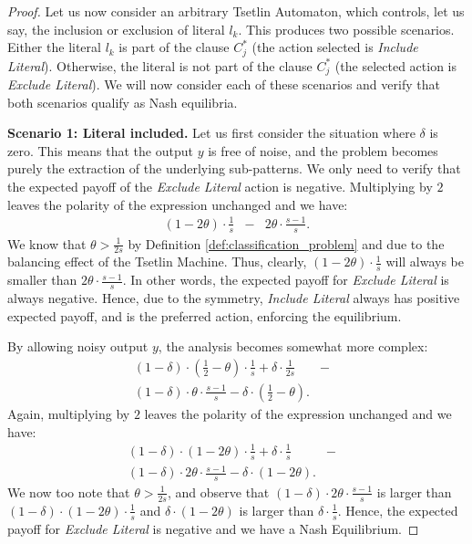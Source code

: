 \documentclass[11pt,a4paper]{article}
\begin{document}
\begin{proof}
Let us now consider an arbitrary Tsetlin Automaton, which controls, let us say, the inclusion or exclusion of literal $l_k$. This produces two possible scenarios. Either the literal $l_k$ is part of the clause $C^*_j$ (the action selected is \emph{Include Literal}). Otherwise, the literal is not part of the clause $C^*_j$ (the selected action is \emph{Exclude Literal}). We will now consider each of these scenarios and verify that both scenarios qualify as Nash equilibria.

{\bf Scenario 1: Literal included.} Let us first consider the situation where $\delta$ is zero. This means that the output $y$ is free of noise, and the problem becomes purely the extraction of the underlying sub-patterns. We only need to verify that the expected payoff of the \emph{Exclude Literal} action is negative. Multiplying by $2$ leaves the polarity of the expression unchanged and we have: 
\begin{eqnarray}
\left(1-2\theta\right) \cdot \frac{1}{s} 
 &-& 2 \theta \cdot \frac{s-1}{s}.
\end{eqnarray}
We know that $\theta > \frac{1}{2s}$ by Definition \ref{def:classification_problem} and due to the balancing effect of the Tsetlin Machine. Thus, clearly, $\left(1-2\theta\right) \cdot \frac{1}{s}$ will always be smaller than $2 \theta \cdot \frac{s-1}{s}$. In other words, the expected payoff for \emph{Exclude Literal} is always negative. Hence, due to the symmetry, \emph{Include Literal} always has positive expected payoff, and is the preferred action, enforcing the equilibrium.

By allowing noisy output $y$, the analysis becomes somewhat more complex:
\begin{eqnarray}
(1 - \delta) \cdot (\frac{1}{2}-\theta) \cdot \frac{1}{s} + \delta \cdot \frac{1}{2s}
 &-&\nonumber\\
(1 - \delta) \cdot \theta \cdot \frac{s-1}{s} - \delta \cdot \left(\frac{1}{2}-\theta\right).
\end{eqnarray}
Again, multiplying by $2$ leaves the polarity of the expression unchanged and we have:
\begin{eqnarray}
(1 - \delta) \cdot (1 -2\theta) \cdot \frac{1}{s} + \delta \cdot \frac{1}{s}
 &-&\nonumber\\
(1 - \delta) \cdot 2\theta \cdot \frac{s-1}{s} - \delta \cdot \left(1-2\theta\right).
\end{eqnarray}
We now too note that $\theta > \frac{1}{2s}$, and
observe that $(1 - \delta) \cdot 2\theta \cdot \frac{s-1}{s}$ is larger than $(1 - \delta) \cdot (1-2\theta) \cdot \frac{1}{s}$ and $\delta \cdot \left(1-2\theta\right)$ is larger than $\delta \cdot \frac{1}{s}$. Hence, the expected payoff for \emph{Exclude Literal} is negative and we have a Nash Equilibrium.


\end{proof}
\end{document}
